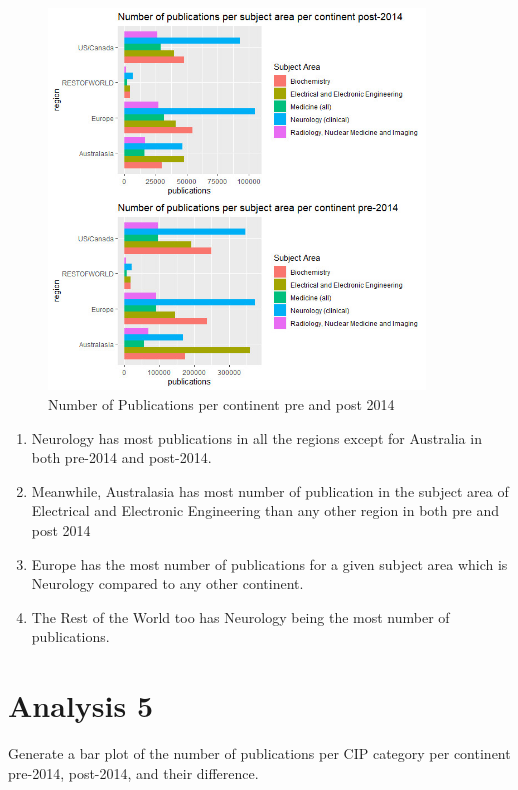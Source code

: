 \documentclass[a4paper,11pt]{article}
\theoremstyle{mytheor}
\begin{document}
\begin{figure}[htp]
    \centering
    \includegraphics[width=10cm]{Q4_plot.jpeg}
    \caption{Number of Publications per continent pre and post 2014}
    \label{fig:galaxy}
\end{figure}

\begin{enumerate}[1.]
    
\item Neurology has most publications in all the regions except for Australia in both pre-2014 and post-2014. 

\item Meanwhile, Australasia has most number of publication in the subject area of Electrical and Electronic Engineering than any other region in both pre and post 2014

\item Europe has the most number of publications for a given subject area which is Neurology compared to any other continent.

\item The Rest of the World too has Neurology being the most number of publications.

\end{enumerate}



\section*{Analysis 5}

Generate a bar plot of the number of publications per CIP category per continent pre-2014, post-2014, and their difference.
\end{document}
